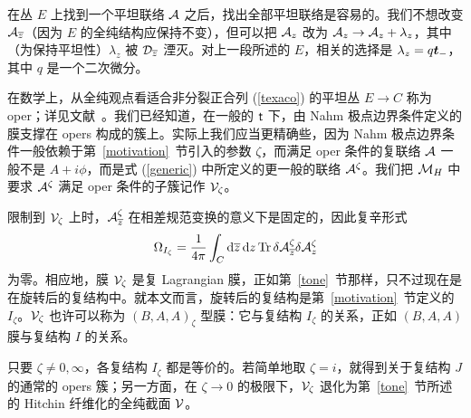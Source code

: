 在丛 $E$ 上找到一个平坦联络 ${\mathcal A}$ 之后，找出全部平坦联络是容易的。我们不想改变 ${\mathcal A}_{\overline z}$（因为 $E$ 的全纯结构应保持不变），但可以把 ${\mathcal A}_z$ 改为 ${\mathcal A}_z\to {\mathcal A}_z+\lambda_z$，其中（为保持平坦性）$\lambda_z$ 被 ${\mathcal D}_{\overline z}$ 湮灭。对上一段所述的 $E$，相关的选择是 $\lambda_z=q{\boldsymbol{t}}_-$，其中 $q$ 是一个二次微分。

在数学上，从全纯观点看适合非分裂正合列 (\ref{texaco}) 的平坦丛 $E\to C$ 称为 oper；详见文献~\cite{Frenkel}。我们已经知道，在一般的 ${ \sf t}$ 下，由 Nahm 极点边界条件定义的膜支撑在 opers 构成的簇上。实际上我们应当更精确些，因为 Nahm 极点边界条件一般依赖于第~\ref{motivation}~节引入的参数 $\zeta$，而满足 oper 条件的复联络 ${\mathcal A}$ 一般不是 $A+i\phi$，而是式 (\ref{generic}) 中所定义的更一般的联络 ${\mathcal A}^\zeta$。我们把 ${\mathcal M}_H$ 中要求 ${\mathcal A}^\zeta$ 满足 oper 条件的子簇记作 ${\mathcal V}_\zeta$。



限制到 ${\mathcal V}_\zeta$ 上时，${\mathcal A}^\zeta_{\overline z}$ 在相差规范变换的意义下是固定的，因此复辛形式
\begin{equation}\label{tufo}\Omega_{I_\zeta}=\frac{1}{4\pi}\int_C{\mathrm d}\overline z\,{\mathrm d} z\,{\mathrm {Tr}}\,\delta{\mathcal A}^\zeta_{\overline z}\delta{\mathcal A}_z
^\zeta
\end{equation}
为零。相应地，膜 ${\mathcal V}_\zeta$ 是复 Lagrangian 膜，正如第~\ref{tone}~节那样，只不过现在是在旋转后的复结构中。就本文而言，旋转后的复结构是第~\ref{motivation}~节定义的 $I_\zeta$。${\mathcal V}_\zeta$ 也许可以称为 $(B,A,A)_\zeta$ 型膜：它与复结构 $I_\zeta$ 的关系，正如 $(B,A,A)$ 膜与复结构 $I$ 的关系。

只要 $\zeta\not=0,\infty$，各复结构 $I_\zeta$ 都是等价的。若简单地取 $\zeta=i$，就得到关于复结构 $J$ 的通常的 opers 簇；另一方面，在 $\zeta\to 0$ 的极限下，${\mathcal V}_\zeta$ 退化为第~\ref{tone}~节所述的 Hitchin 纤维化的全纯截面 ${\mathcal V}$。

